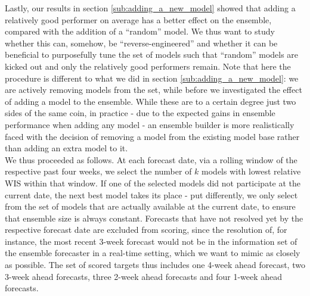 Lastly, our results in section \ref{sub:adding_a_new_model} showed that adding a relatively good performer on average has a better effect on the ensemble, compared with the addition of a ``random'' model. We thus want to study whether this can, somehow, be ``reverse-engineered'' and whether it can be beneficial to purposefully tune the set of models such that ``random'' models are kicked out and only the relatively good performers remain. Note that here the procedure is different to what we did in section \ref{sub:adding_a_new_model}: we are actively removing models from the set, while before we investigated the effect of adding a model to the ensemble. While these are to a certain degree just two sides of the same coin, in practice - due to the expected gains in ensemble performance when adding any model - an ensemble builder is more realistically faced with the decision of removing a model from the existing model base rather than adding an extra model to it. \medskip \\ %
We thus proceeded as follows. At each forecast date, via a rolling window of the respective past four weeks, we select the number of $k$ models with lowest relative WIS within that window. If one of the selected models did not participate at the current date, the next best model takes its place - put differently, we only select from the set of models that are actually available at the current date, to ensure that ensemble size is always constant. Forecasts that have not resolved yet by the respective forecast date are excluded from scoring, since the resolution of, for instance, the most recent 3-week forecast would not be in the information set of the ensemble forecaster in a real-time setting, which we want to mimic as closely as possible. The set of scored targets thus includes one 4-week ahead forecast, two 3-week ahead forecasts, three 2-week ahead forecasts and four 1-week ahead forecasts.\\
